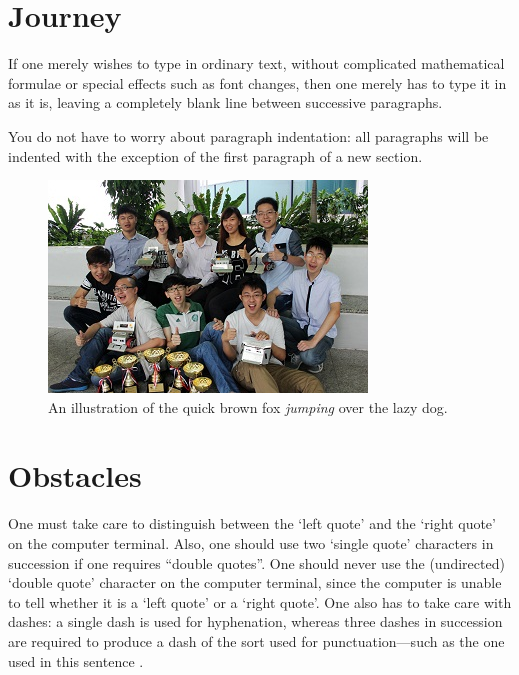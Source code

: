 \documentclass[12pt,a4paper]{article}
\begin{document}
\tableofcontents
\newpage

\section{Journey}
If one merely wishes to type in ordinary text, without
complicated mathematical formulae or special effects such
as font changes, then one merely has to type it in as it
is, leaving a completely blank line between successive
paragraphs.

You do not have to worry about paragraph indentation:
all paragraphs will be indented with the exception of
the first paragraph of a new section.

\begin{figure}[h]
      \centering
      \includegraphics[scale=0.7]{jiaming}
      \caption{\label{fig:homofilter} An illustration of the quick brown fox \emph{jumping} over the lazy dog.}
\end{figure} 
\newpage

\section{Obstacles}
One must take care to distinguish between the `left quote'
and the `right quote' on the computer terminal.  Also, one
should use two `single quote' characters in succession if
one requires ``double quotes''.  One should never use the
(undirected) `double quote' character on the computer
terminal, since the computer is unable to tell whether it
is a `left quote' or a `right quote'.  One also has to
take care with dashes: a single dash is used for
hyphenation, whereas three dashes in succession are required
to produce a dash of the sort used for punctuation---such as
the one used in this sentence \cite{wang2005modular}.



\end{document}
